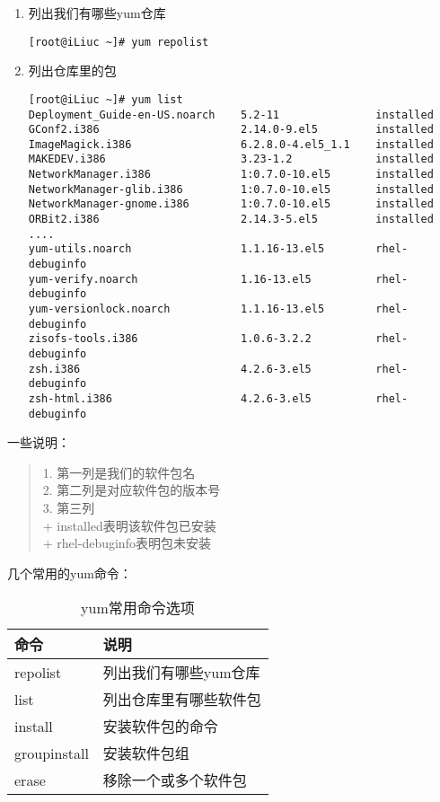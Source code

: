 \begin{enumerate}[itemsep=0pt,parsep=0pt]
\item 列出我们有哪些yum仓库
  \small{
\begin{verbatim}
[root@iLiuc ~]# yum repolist
\end{verbatim}
  }
  \normalsize

\item 列出仓库里的包
\begin{verbatim}
[root@iLiuc ~]# yum list
Deployment_Guide-en-US.noarch    5.2-11               installed     
GConf2.i386                      2.14.0-9.el5         installed     
ImageMagick.i386                 6.2.8.0-4.el5_1.1    installed     
MAKEDEV.i386                     3.23-1.2             installed     
NetworkManager.i386              1:0.7.0-10.el5       installed     
NetworkManager-glib.i386         1:0.7.0-10.el5       installed     
NetworkManager-gnome.i386        1:0.7.0-10.el5       installed     
ORBit2.i386                      2.14.3-5.el5         installed    
....
yum-utils.noarch                 1.1.16-13.el5        rhel-debuginfo
yum-verify.noarch                1.16-13.el5          rhel-debuginfo
yum-versionlock.noarch           1.1.16-13.el5        rhel-debuginfo
zisofs-tools.i386                1.0.6-3.2.2          rhel-debuginfo
zsh.i386                         4.2.6-3.el5          rhel-debuginfo
zsh-html.i386                    4.2.6-3.el5          rhel-debuginfo
\end{verbatim}
\end{enumerate}

一些说明：
\begin{quote}
    1. 第一列是我们的软件包名 \\
    2. 第二列是对应软件包的版本号 \\
    3. 第三列 \\
    + installed表明该软件包已安装 \\
    + rhel-debuginfo表明包未安装 
\end{quote}

几个常用的yum命令：
\begin{table}[!htbp]
  \centering
    \caption{yum常用命令选项}
    \begin{tabular}{ll}
      \toprule
      命令           & 说明 \\
      \midrule
      repolist       & 列出我们有哪些yum仓库 \\
      list           & 列出仓库里有哪些软件包 \\
      install        & 安装软件包的命令 \\
      groupinstall   & 安装软件包组 \\
      erase          & 移除一个或多个软件包 \\
      \bottomrule
    \end{tabular}
\end{table}
